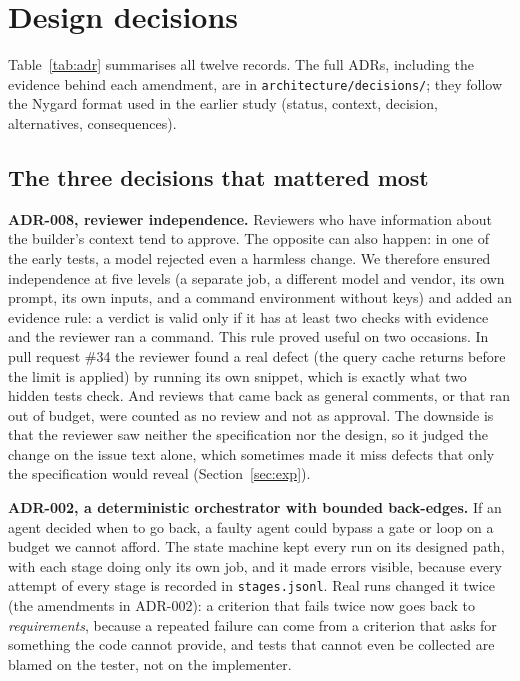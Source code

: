 \documentclass[10pt,a4paper]{article}
\newcommand{\adr}[1]{\textsf{ADR-#1}}
\newcommand{\code}[1]{\texttt{\small #1}}
\begin{document}
\section{Design decisions}
Table~\ref{tab:adr} summarises all twelve records. The full ADRs, including the evidence behind each amendment, are in \code{architecture/decisions/}; they follow the Nygard format used in the earlier study (status, context, decision, alternatives, consequences).



\subsection*{The three decisions that mattered most}
\textbf{\adr{008}, reviewer independence.} Reviewers who have information about the builder's context tend to approve. The opposite can also happen: in one of the early tests, a model rejected even a harmless change. We therefore ensured independence at five levels (a separate job, a different model and vendor, its own prompt, its own inputs, and a command environment without keys) and added an evidence rule: a verdict is valid only if it has at least two checks with evidence and the reviewer ran a command. This rule proved useful on two occasions. In pull request \#34 the reviewer found a real defect (the query cache returns before the limit is applied) by running its own snippet, which is exactly what two hidden tests check. And reviews that came back as general comments, or that ran out of budget, were counted as no review and not as approval. The downside is that the reviewer saw neither the specification nor the design, so it judged the change on the issue text alone, which sometimes made it miss defects that only the specification would reveal (Section~\ref{sec:exp}).

\textbf{\adr{002}, a deterministic orchestrator with bounded back-edges.} If an agent decided when to go back, a faulty agent could bypass a gate or loop on a budget we cannot afford. The state machine kept every run on its designed path, with each stage doing only its own job, and it made errors visible, because every attempt of every stage is recorded in \code{stages.jsonl}. Real runs changed it twice (the amendments in \adr{002}): a criterion that fails twice now goes back to \emph{requirements}, because a repeated failure can come from a criterion that asks for something the code cannot provide, and tests that cannot even be collected are blamed on the tester, not on the implementer.
\end{document}
